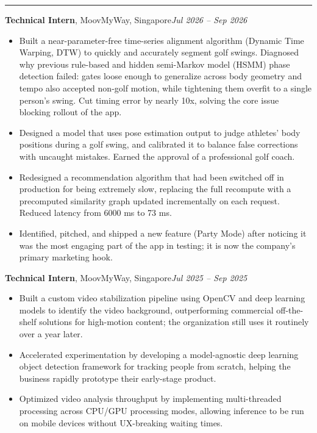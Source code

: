 \documentclass[11pt]{article}
\newcommand{\cvsection}[1]{%
  \vspace{10pt}%
  \noindent{\large\bfseries\MakeUppercase{#1}}\par
  \vspace{-4pt}\noindent\rule{\linewidth}{0.7pt}\vspace{4pt}%
}
\begin{document}
\cvsection{Experience}
\noindent\textbf{Technical Intern}, MoovMyWay, Singapore\hfill\textit{Jul 2026 -- Sep 2026}\par
\begin{itemize}
  \item Built a near-parameter-free time-series alignment algorithm (Dynamic Time Warping, DTW) to quickly and accurately segment golf swings. Diagnosed why previous rule-based and hidden semi-Markov model (HSMM) phase detection failed: gates loose enough to generalize across body geometry and tempo also accepted non-golf motion, while tightening them overfit to a single person's swing. Cut timing error by nearly 10x, solving the core issue blocking rollout of the app.
  \item Designed a model that uses pose estimation output to judge athletes' body positions during a golf swing, and calibrated it to balance false corrections with uncaught mistakes. Earned the approval of a professional golf coach.
  \item Redesigned a recommendation algorithm that had been switched off in production for being extremely slow, replacing the full recompute with a precomputed similarity graph updated incrementally on each request. Reduced latency from 6000 ms to 73 ms.
  \item Identified, pitched, and shipped a new feature (Party Mode) after noticing it was the most engaging part of the app in testing; it is now the company's primary marketing hook.
\end{itemize}

\vspace{4pt}
\noindent\textbf{Technical Intern}, MoovMyWay, Singapore\hfill\textit{Jul 2025 -- Sep 2025}\par
\begin{itemize}
  \item Built a custom video stabilization pipeline using OpenCV and deep learning models to identify the video background, outperforming commercial off-the-shelf solutions for high-motion content; the organization still uses it routinely over a year later.
  \item Accelerated experimentation by developing a model-agnostic deep learning object detection framework for tracking people from scratch, helping the business rapidly prototype their early-stage product.
  \item Optimized video analysis throughput by implementing multi-threaded processing across CPU/GPU processing modes, allowing inference to be run on mobile devices without UX-breaking waiting times.
\end{itemize}
\end{document}
